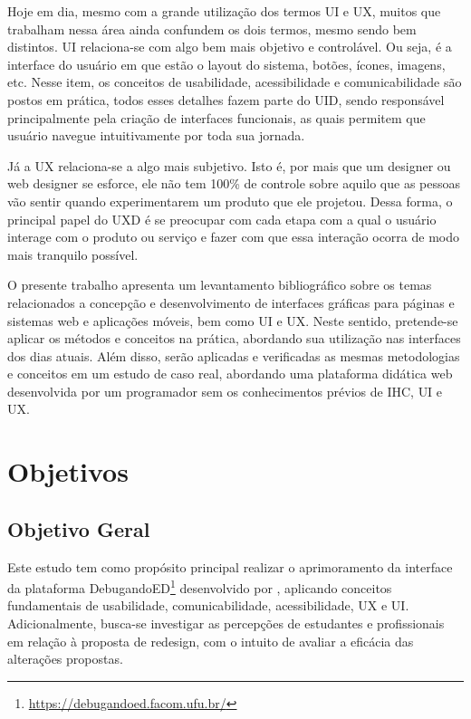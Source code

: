 Hoje em dia, mesmo com a grande utilização dos termos \ac{UI} e \ac{UX}, muitos que trabalham nessa área ainda confundem os dois termos, mesmo sendo bem distintos. \acf{UI} relaciona-se com algo bem mais objetivo e controlável. Ou seja, é a interface do usuário em que estão o layout do sistema, botões, ícones, imagens, etc. Nesse item, os conceitos de usabilidade, acessibilidade e comunicabilidade são postos em prática, todos esses detalhes fazem parte do \ac{UID}, sendo responsável principalmente pela criação de interfaces funcionais, as quais permitem que usuário navegue intuitivamente por toda sua jornada. 

Já a \acf{UX} relaciona-se a algo mais subjetivo. Isto é, por mais que um designer ou web designer se esforce, ele não tem 100\% de controle sobre aquilo que as pessoas vão sentir quando experimentarem um produto que ele projetou. Dessa forma, o principal papel do \ac{UXD} é se preocupar com cada etapa com a qual o usuário interage com o produto ou serviço e fazer com que essa interação ocorra de modo mais tranquilo possível.

O presente trabalho apresenta um levantamento bibliográfico sobre os temas relacionados a concepção e desenvolvimento de interfaces gráficas para páginas e sistemas web e aplicações móveis, bem como \acs{UI} e \acs{UX}. Neste sentido, pretende-se aplicar os métodos e conceitos na prática, abordando sua utilização nas interfaces dos dias atuais. Além disso, serão aplicadas e verificadas as mesmas metodologias e conceitos em um estudo de caso real, abordando uma plataforma didática web desenvolvida por um programador sem os conhecimentos prévios de \acs{IHC}, \acs{UI} e \acs{UX}.

\section{Objetivos}

\subsection{Objetivo Geral}
Este estudo tem como propósito principal realizar o aprimoramento da interface da plataforma DebugandoED\footnote{\url{https://debugandoed.facom.ufu.br/}} desenvolvido por , aplicando conceitos fundamentais de usabilidade, comunicabilidade, acessibilidade, \ac{UX} e \ac{UI}. Adicionalmente, busca-se investigar as percepções de estudantes e profissionais em relação à proposta de redesign, com o intuito de avaliar a eficácia das alterações propostas.

